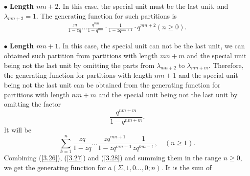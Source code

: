 \documentclass[draft]{amsart}
\numberwithin{equation}{section}
\theoremstyle{plain}
\theoremstyle{remark}
\begin{document}
$\bullet$ {\bf Length $mn+2$.}
In this case, the special unit must be the last unit. and $\lambda_{mn+2}=1$. The generating function for such partitions is
\begin{align}
\frac{zq}{1-zq}\dots\frac{q^{mn}}{1-q^{mn}}\cdot\frac{1}{1-zq^{mn+1}}\cdot q^{mn+2}(n\geq0).\label{3.27}
\end{align}




$\bullet$ {\bf Length $mn+1.$}
In this case, the special unit can not be the last unit, we can obtained such partition from partitions with length $mn+m$ and the special unit being not the last unit by omitting the parts from $\lambda_{mn+2}$ to $\lambda_{mn+m}$. Therefore, the generating function for partitions with length  $nm+1$ and the special unit being not the last unit can be obtained from the generating function for partitions with length $nm+m$ and the special unit being not the last unit by omitting the factor
$$
\frac{q^{nm+m}}{1-q^{nm+m}}.
$$
It will be
\begin{equation}
\sum_{k=1}^{n}\frac{zq}{1-zq}\dots\frac{zq^{mn+1}}{1-zq^{mn+1}}\frac{1}{zq^{km-1}},    \quad(n\geq 1).\label{3.28}
\end{equation}
Combining (\ref{3.26}), (\ref{3.27}) and (\ref{3.28}) and summing them in the range $n\geq 0$, we get the generating function for $a(\Sigma, 1, 0\dots, 0;  n)$.  It is the sum of
\end{document}
